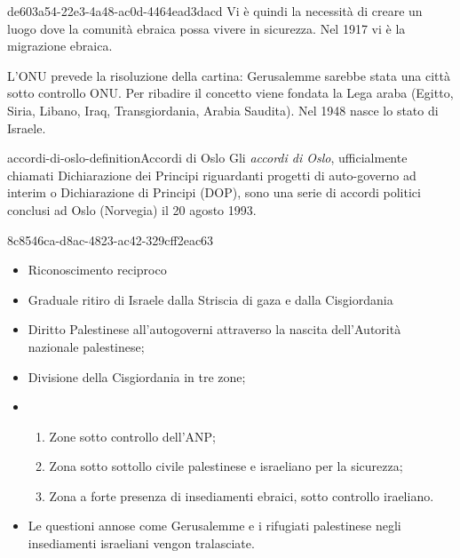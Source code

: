 \documentclass[preview]{standalone}
\begin{document}
\begin{snippet}{de603a54-22e3-4a48-ac0d-4464ead3dacd}
    Vi è quindi la necessità di creare un luogo dove la comunità ebraica possa vivere in sicurezza.
    Nel 1917 vi è la migrazione ebraica.
    
    L'ONU prevede la risoluzione della cartina:
    Gerusalemme sarebbe stata una città sotto controllo ONU.
    Per ribadire il concetto viene fondata la Lega araba
    (Egitto, Siria, Libano, Iraq, Transgiordania, Arabia Saudita).
    Nel 1948 nasce lo stato di Israele. 
    
\end{snippet}

\begin{snippetdefinition}{accordi-di-oslo-definition}{Accordi di Oslo}
    Gli \textit{accordi di Oslo}, ufficialmente chiamati Dichiarazione dei
    Principi riguardanti progetti di auto-governo ad interim o
    Dichiarazione di Principi (DOP), sono una serie di accordi
    politici conclusi ad Oslo (Norvegia) il 20 agosto 1993.
\end{snippetdefinition}

\begin{snippet}{8c8546ca-d8ac-4823-ac42-329cff2eac63}
    \begin{itemize}
        \item Riconoscimento reciproco
        \item Graduale ritiro di Israele dalla Striscia di gaza e dalla Cisgiordania
        \item Diritto Palestinese all'autogoverni attraverso la nascita dell'Autorità nazionale palestinese;
        \item Divisione della Cisgiordania in tre zone;
        \item \begin{enumerate}
            \item Zone sotto controllo dell'ANP;
            \item Zona sotto sottollo civile palestinese e israeliano per la sicurezza;
            \item Zona a forte presenza di insediamenti ebraici, sotto controllo iraeliano.
        \end{enumerate}
        \item Le questioni annose come Gerusalemme e i rifugiati palestinese negli insediamenti israeliani vengon tralasciate.
    \end{itemize}
\end{snippet}
\end{document}
